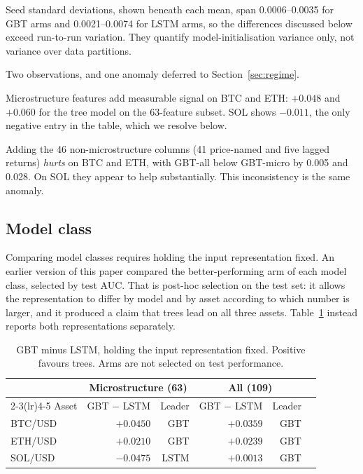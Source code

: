 \documentclass[11pt]{article}
\begin{document}
\noindent
Seed standard deviations, shown beneath each mean, span 0.0006--0.0035 for GBT
arms and 0.0021--0.0074 for LSTM arms, so the differences discussed below
exceed run-to-run variation. They quantify model-initialisation variance only,
not variance over data partitions.

Two observations, and one anomaly deferred to Section~\ref{sec:regime}.

Microstructure features add measurable signal on BTC and ETH: $+0.048$ and
$+0.060$ for the tree model on the 63-feature subset. SOL shows $-0.011$, the
only negative entry in the table, which we resolve below.

Adding the 46 non-microstructure columns (41 price-named and five lagged
returns) \emph{hurts} on BTC and ETH, with GBT-all below GBT-micro by 0.005 and
0.028. On SOL they appear to help substantially. This
inconsistency is the same anomaly.

\subsection{Model class}
\label{sec:modelclass}

Comparing model classes requires holding the input representation fixed. An
earlier version of this paper compared the better-performing arm of each model
class, selected by test AUC. That is post-hoc selection on the test set: it
allows the representation to differ by model and by asset according to which
number is larger, and it produced a claim that trees lead on all three assets.
Table~\ref{tab:modelclass} instead reports both representations separately.

\begin{table}[ht]
\centering
\caption{GBT minus LSTM, holding the input representation fixed. Positive
favours trees. Arms are not selected on test performance.}
\label{tab:modelclass}
\begin{tabular}{lrrrrr}
\toprule
& \multicolumn{2}{c}{Microstructure (63)} & \multicolumn{2}{c}{All (109)} \\
\cmidrule(lr){2-3}\cmidrule(lr){4-5}
Asset & GBT $-$ LSTM & Leader & GBT $-$ LSTM & Leader \\
\midrule
BTC/USD & $+0.0450$ & GBT  & $+0.0359$ & GBT \\
ETH/USD & $+0.0210$ & GBT  & $+0.0239$ & GBT \\
SOL/USD & $-0.0475$ & LSTM & $+0.0013$ & GBT \\
\bottomrule
\end{tabular}
\end{table}
\end{document}
